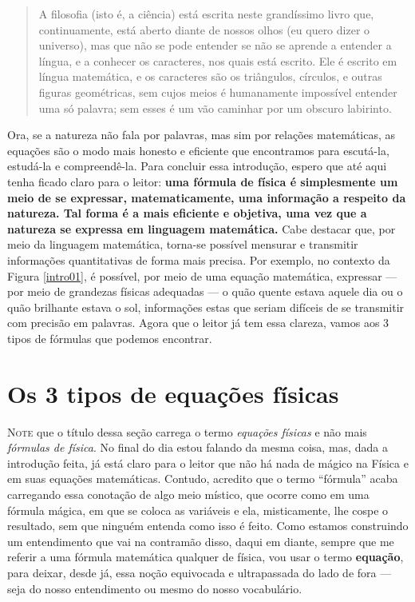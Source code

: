 \begin{quote}
    A filosofia (isto é, a ciência) está escrita neste grandíssimo livro que, continuamente, está aberto diante de nossos olhos (eu quero dizer o universo), mas que não se pode entender se não se aprende a entender a língua, e a conhecer os caracteres, nos quais está escrito. Ele é escrito em língua matemática, e os caracteres são os triângulos, círculos, e outras figuras geométricas, sem cujos meios é humanamente impossível entender uma só palavra; sem esses é um vão caminhar por um obscuro labirinto.
\end{quote}


Ora, se a natureza não fala por palavras, mas sim por relações matemáticas, as equações são o modo mais honesto e eficiente que encontramos para escutá-la, estudá-la e compreendê-la. Para concluir essa introdução, espero que até aqui tenha ficado claro para o leitor: \textbf{uma fórmula de física é simplesmente um meio de se expressar, matematicamente, uma informação a respeito da natureza. Tal forma é a mais eficiente e objetiva, uma vez que a natureza se expressa em linguagem matemática.} Cabe destacar que, por meio da linguagem matemática, torna-se possível mensurar e transmitir informações quantitativas de forma mais precisa. Por exemplo, no contexto da Figura \ref{intro01}, é possível, por meio de uma equação matemática, expressar --- por meio de grandezas físicas adequadas --- o quão quente estava aquele dia ou o quão brilhante estava o sol, informações estas que seriam difíceis de se transmitir com precisão em palavras. Agora que o leitor já tem essa clareza, vamos aos 3 tipos de fórmulas que podemos encontrar.




\section{Os 3 tipos de equações físicas}

\lettrine{N}{ote} que o título dessa seção carrega o termo \textit{equações físicas} e não mais \textit{fórmulas de física}. No final do dia estou falando da mesma coisa, mas, dada a introdução feita, já está claro para o leitor que não há nada de mágico na Física e em suas equações matemáticas. Contudo, acredito que o termo ``fórmula'' acaba carregando essa conotação de algo meio místico, que ocorre como em uma fórmula mágica, em que se coloca as variáveis e ela, misticamente, lhe cospe o resultado, sem que ninguém entenda como isso é feito. Como estamos construindo um entendimento que vai na contramão disso, daqui em diante, sempre que me referir a uma fórmula matemática qualquer de física, vou usar o termo \textbf{equação}, para deixar, desde já, essa noção equivocada e ultrapassada do lado de fora --- seja do nosso entendimento ou mesmo do nosso vocabulário.


